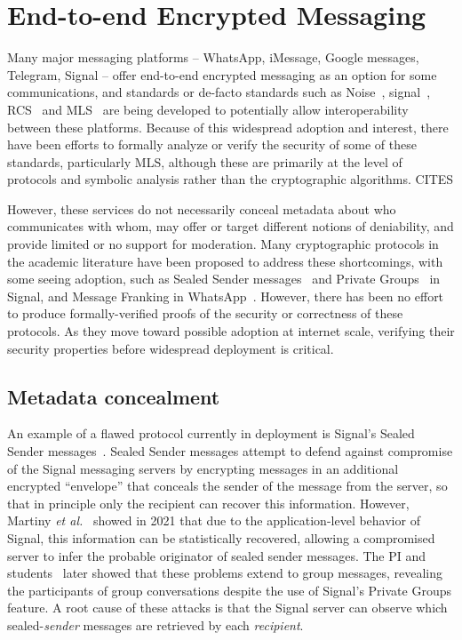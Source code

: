 \section{End-to-end Encrypted Messaging}\label{sec:e2ee}
Many major messaging platforms -- WhatsApp, iMessage, Google messages, Telegram, Signal -- offer end-to-end encrypted messaging as an option for some communications, and standards or de-facto standards such as Noise~\cite{}, signal~\cite{}, RCS~\cite{} and MLS~\cite{} are being developed to potentially allow interoperability between these platforms.  Because of this widespread adoption and interest, there have been efforts to formally analyze or verify the security of some of these standards, particularly MLS, although these are primarily at the level of protocols and symbolic analysis rather than the cryptographic algorithms. CITES

However, these services do not necessarily conceal metadata about who communicates with whom, may offer or target different notions of deniability, and provide limited or no support for moderation.  
Many cryptographic protocols in the academic literature have been proposed to address these shortcomings, with some seeing adoption, such as Sealed Sender messages~\cite{} and Private Groups~\cite{} in Signal, and Message Franking in WhatsApp~\cite{}.  
However, there has been no effort to produce formally-verified proofs of the security or correctness of these protocols.  
As they move toward possible adoption at internet scale, verifying their security properties before widespread deployment is critical.

\subsection{Metadata concealment}\label{sec:omr}
An example of a flawed protocol currently in deployment is Signal's Sealed Sender messages~\cite{}. 
Sealed Sender messages attempt to defend against compromise of the Signal messaging servers by encrypting messages in an additional encrypted ``envelope'' that conceals the sender of the message from the server, so that in principle only the recipient can recover this information.  
However, Martiny {\em et al.}~\cite{} showed in 2021 that due to the application-level behavior of Signal, this information can be statistically recovered, allowing a compromised server to infer the probable originator of sealed sender messages.  
The PI and students~\cite{} later showed that these problems extend to group messages, revealing the participants of group conversations despite the use of Signal's Private Groups feature.
A root cause of these attacks is that the Signal server can observe which sealed-{\em sender} messages are retrieved by each {\em recipient}.

